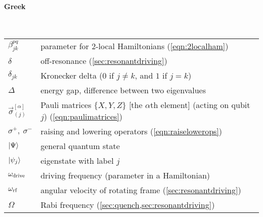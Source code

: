 {\paragraph{Greek} \mbox{} \\[5pt]
\begin{tabular}{ll}
$ \beta^{pq}_{jk}$		& parameter for 2-local Hamiltonians (\cref{eqn:2localham})  \\
$\delta$				& off-resonance (\cref{sec:resonantdriving}) \\
$\delta_{jk}$			& Kronecker delta ($0$ if $j\neq k$, and $1$ if $j=k$) \\
$\Delta$ 				& energy gap, difference between two eigenvalues \\
$\vec{\sigma}_{(j)}^{[\alpha]}$ & Pauli matrices $\{X,Y,Z\}$ [the $\alpha$th element] (acting on qubit $j$) (\cref{eqn:paulimatrices}) \\
$\sigma^+, ~ \sigma^-$ & raising and lowering operators (\cref{eqn:raiselowerops}) \\
$\lvert\Psi\rangle$	& general quantum state \\
$\lvert\psi_j\rangle$	& eigenstate with label $j$ \\
$\omega_\text{drive}$			& driving frequency (parameter in a Hamiltonian)  \\
$\omega_\text{rf}$ 		& angular velocity of rotating frame (\cref{sec:resonantdriving})  \\
$\Omega$ 		& Rabi frequency (\cref{sec:quench,sec:resonantdriving}) 
\end{tabular}



}